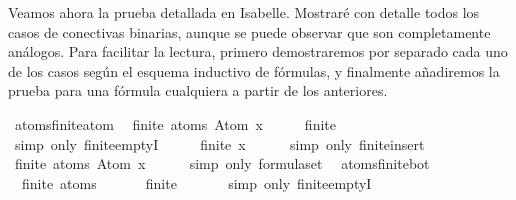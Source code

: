 \begin{isabellebody}
\begin{isamarkuptext}
  Veamos ahora la prueba detallada en Isabelle. Mostraré con detalle 
  todos los casos de conectivas binarias, aunque se puede observar que 
  son completamente análogos. Para facilitar la lectura, primero 
  demostraremos por separado cada uno de los casos según el esquema 
  inductivo de fórmulas, y finalmente añadiremos la prueba para una 
  fórmula cualquiera a partir de los anteriores.%
\end{isamarkuptext}\isamarkuptrue%
\isamarkupfalse%
\ atoms{\isacharunderscore}finite{\isacharunderscore}atom{\isacharcolon}\isanewline
\ \ {\isachardoublequoteopen}finite\ {\isacharparenleft}atoms\ {\isacharparenleft}Atom\ x{\isacharparenright}{\isacharparenright}{\isachardoublequoteclose}\isanewline
%
\isadelimproof
%
\endisadelimproof
%
\isatagproof
{}\isamarkupfalse%
\ {\isacharminus}\isanewline
\ \ \isamarkupfalse%
\ {\isachardoublequoteopen}finite\ {\isasymemptyset}{\isachardoublequoteclose}\isanewline
\ \ \ \ \isamarkupfalse%
\ {\isacharparenleft}simp\ only{\isacharcolon}\ finite{\isachardot}emptyI{\isacharparenright}\isanewline
\ \ \isamarkupfalse%
\ \isamarkupfalse%
\ {\isachardoublequoteopen}finite\ {\isacharbraceleft}x{\isacharbraceright}{\isachardoublequoteclose}\isanewline
\ \ \ \ \isamarkupfalse%
\ {\isacharparenleft}simp\ only{\isacharcolon}\ finite{\isacharunderscore}insert{\isacharparenright}\isanewline
\ \ \isamarkupfalse%
\ \isamarkupfalse%
\ {\isachardoublequoteopen}finite\ {\isacharparenleft}atoms\ {\isacharparenleft}Atom\ x{\isacharparenright}{\isacharparenright}{\isachardoublequoteclose}\isanewline
\ \ \ \ \isamarkupfalse%
\ {\isacharparenleft}simp\ only{\isacharcolon}\ formula{\isachardot}set{\isacharparenleft}{}{\isacharparenright}{\isacharparenright}\ \isanewline
{}\isamarkupfalse%
%
\endisatagproof
{\isafoldproof}%
%
\isadelimproof
\isanewline
%
\endisadelimproof
\isanewline
{}\isamarkupfalse%
\ atoms{\isacharunderscore}finite{\isacharunderscore}bot{\isacharcolon}\isanewline
\ \ {\isachardoublequoteopen}finite\ {\isacharparenleft}atoms\ {\isasymbottom}{\isacharparenright}{\isachardoublequoteclose}\isanewline
%
\isadelimproof
%
\endisadelimproof
%
\isatagproof
{}\isamarkupfalse%
\ {\isacharminus}\isanewline
\ \ \isamarkupfalse%
\ {\isachardoublequoteopen}finite\ {\isasymemptyset}{\isachardoublequoteclose}\isanewline
\ \ \ \ \isamarkupfalse%
\ {\isacharparenleft}simp\ only{\isacharcolon}\ finite{\isachardot}emptyI{\isacharparenright}\isanewline

\end{isabellebody}
